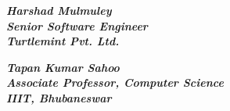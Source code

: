 \begin{flushright}
\textbf{\textit{Harshad Mulmuley}} \\
\textbf{\textit{Senior Software Engineer}} \\
\textbf{\textit{Turtlemint Pvt. Ltd.}}
\end{flushright}
\vspace*{0.5in}
\begin{flushright} 
\textbf{\textit{Tapan Kumar Sahoo}} \\
\textbf{\textit{Associate Professor, Computer Science}} \\
\textbf{\textit{IIIT, Bhubaneswar}}
\end{flushright}
